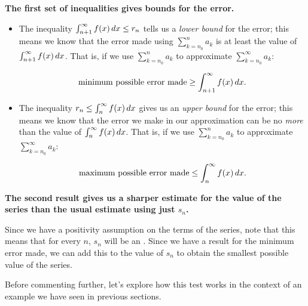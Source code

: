 \documentclass{ximera}
\begin{document}
\textbf{The first set of inequalities gives bounds for the error.}
\begin{itemize}
\item The inequality $\int_{n+1}^{\infty} f(x) \mathop{}\!d x \leq  r_n$ tells us a \emph{lower bound} for the error; this means we know that the error made using $\sum_{k=n_0}^n a_k$ is at least the value of $\int_{n+1}^{\infty} f(x) \mathop{}\!d x$.  That is, if we use $\sum_{k=n_0}^n a_k$ to approximate $\sum_{k=n_0}^\infty a_k$:

\[
\textrm{minimum possible error made}  \geq \int_{n+1}^{\infty} f(x) \mathop{}\!d x.
\]

\item The inequality $r_n \leq \int_{n}^{\infty} f(x) \mathop{}\!d x$ gives us an \emph{upper bound} for the error; this means we know that the error we make in our approximation can be no \emph{more} than the value of $\int_{n}^{\infty} f(x) \mathop{}\!d x$. That is, if we use $\sum_{k=n_0}^n a_k$ to approximate $\sum_{k=n_0}^\infty a_k$:

\[
\textrm{maximum possible error made}  \leq \int_{n}^{\infty} f(x) \mathop{}\!d x.
\]
\end{itemize}

\textbf{The second result gives us a sharper estimate for the value of the series than the usual estimate using just $s_n$.}

Since we have a positivity assumption on the terms of the series, note that this means that for every $n$, $s_n$ will be an .  Since we have a result for the minimum error made, we can add this to the value of $s_n$ to obtain the smallest possible value of the series.

Before commenting further, let's explore how this test works in the context of an example we have seen in previous sections.
\end{document}

